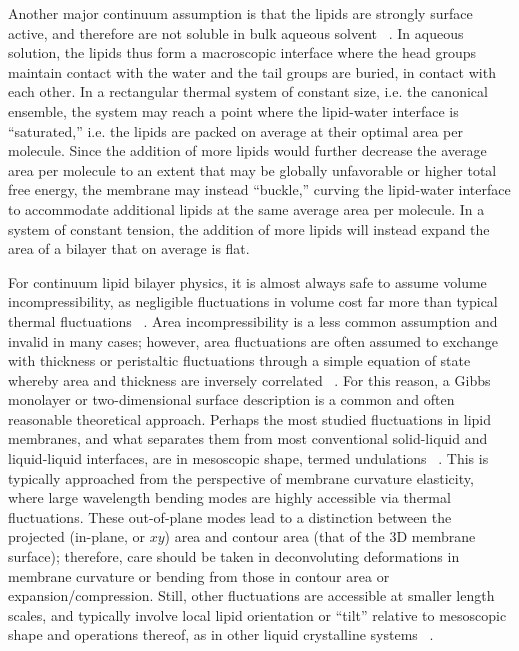 \documentclass[9pt,bestpractices,pubversion]{livecoms}
\begin{document}
Another major continuum assumption is that the lipids are strongly surface active, and therefore are not soluble in bulk aqueous solvent ~\cite{Safran1994}.
In aqueous solution, the lipids thus form a macroscopic interface where the head groups maintain contact with the water and the tail groups are buried, in contact with each other.
In a rectangular thermal system of constant size, i.e. the canonical ensemble, the system may reach a point where the lipid-water interface is ``saturated,'' i.e. the lipids are packed on average at their optimal area per molecule.
Since the addition of more lipids would further decrease the average area per molecule to an extent that may be globally unfavorable or higher total free energy, the membrane may instead ``buckle,'' curving the lipid-water interface to accommodate additional lipids at the same average area per molecule.
In a system of constant tension, the addition of more lipids will instead expand the area of a bilayer that on average is flat.

For continuum lipid bilayer physics, it is almost always safe to assume volume incompressibility, as negligible fluctuations in volume cost far more than typical thermal fluctuations ~\cite{Safran1994,Sundararajan2008}.
Area incompressibility is a less common assumption and invalid in many cases; however, area fluctuations are often assumed to exchange with thickness or peristaltic fluctuations through a simple equation of state whereby area and thickness are inversely correlated ~\cite{Safran1994}.
For this reason, a Gibbs monolayer or two-dimensional surface description is a common and often reasonable theoretical approach.
Perhaps the most studied fluctuations in lipid membranes, and what separates them from most conventional solid-liquid and liquid-liquid interfaces, are in mesoscopic shape, termed undulations ~\cite{Canham1970b,Helfrich1973a}.
This is typically approached from the perspective of membrane curvature elasticity, where large wavelength bending modes are highly accessible via thermal fluctuations.
These out-of-plane modes lead to a distinction between the projected (in-plane, or $xy$) area and contour area (that of the 3D membrane surface); therefore, care should be taken in deconvoluting deformations in membrane curvature or bending from those in contour area or expansion/compression.
Still, other fluctuations are accessible at smaller length scales, and typically involve local lipid orientation or ``tilt'' relative to mesoscopic shape and operations thereof, as in other liquid crystalline systems ~\cite{Hamm2000,May2007,Watson2011a,Watson2013b}.
\end{document}
